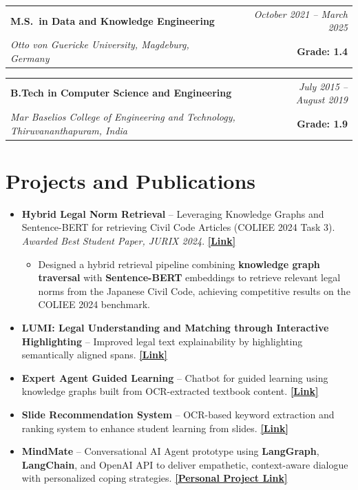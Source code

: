 \documentclass[a4paper,11pt]{article}
\makeatletter
\newcommand{\resumeSubheading}[4]{
  \vspace{4pt}
  \begin{tabular*}{\textwidth}{l@{\extracolsep{\fill}}r}
    \textbf{#1} & \textit{\small #4} \\
    \textit{\small #3} & \small #2 \\
  \end{tabular*}\vspace{-4pt}
}
\makeatother
\begin{document}
\resumeSubheading
{M.S.\ in Data and Knowledge Engineering}{\textbf{Grade: 1.4}}{Otto von Guericke University, Magdeburg, Germany}{October 2021 -- March 2025}

\vspace{-2pt}

\resumeSubheading
{B.Tech in Computer Science and Engineering}{\textbf{Grade: 1.9}}{Mar Baselios College of Engineering and Technology, Thiruvananthapuram, India}{July 2015 -- August 2019}

\vspace{-1mm}

\section{Projects and Publications}
\begin{itemize}[leftmargin=3ex, rightmargin=2ex, noitemsep, labelsep=1.2mm, itemsep=0.7mm]\small
  \item \textbf{Hybrid Legal Norm Retrieval} -- Leveraging Knowledge Graphs and Sentence-BERT for retrieving Civil Code Articles (COLIEE 2024 Task 3). \textit{Awarded Best Student Paper, JURIX 2024}. \href{https://www.researchgate.net/publication/386467227_Hybrid_Legal_Norm_Retrieval_Leveraging_Knowledge_Graphs_and_Textual_Representations}{\textbf{[Link]}}
  \begin{itemize}[leftmargin=2em, itemsep=0mm]
    \item {\small Designed a hybrid retrieval pipeline combining \textbf{knowledge graph traversal} with \textbf{Sentence-BERT} embeddings to retrieve relevant legal norms from the Japanese Civil Code, achieving competitive results on the COLIEE 2024 benchmark.}
  \end{itemize}

  \item \textbf{LUMI: Legal Understanding and Matching through Interactive Highlighting} -- Improved legal text explainability by highlighting semantically aligned spans. \href{https://www.researchgate.net/publication/386466576_LUMI_Legal_Understanding_and_Matching_Through_Interactive_Highlighting}{\textbf{[Link]}}

  \item \textbf{Expert Agent Guided Learning} -- Chatbot for guided learning using knowledge graphs built from OCR-extracted textbook content. \href{https://www.insticc.org/node/TechnicalProgram/data/2024/presentationDetails/128607}{\textbf{[Link]}}

  \item \textbf{Slide Recommendation System} -- OCR-based keyword extraction and ranking system to enhance student learning from slides. \href{https://ieeexplore.ieee.org/document/10252423}{\textbf{[Link]}}

  \item \textbf{MindMate} -- Conversational AI Agent prototype using \textbf{LangGraph}, \textbf{LangChain}, and OpenAI API to deliver empathetic, context-aware dialogue with personalized coping strategies. \href{https://github.com/visakhpadmanabhan7/MindMate}{\textbf{[Personal Project Link]}}
\end{itemize}
\end{document}
